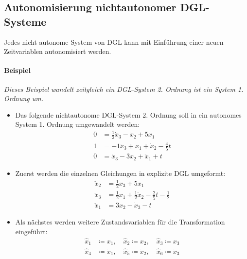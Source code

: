 \documentclass[a4paper, 11pt, accentcolor = tud3b]{tudreport}
\begin{document}
            \subsection{Autonomisierung nichtautonomer DGL-Systeme} %
                Jedes nicht-autonome System von DGL kann mit Einführung einer neuen Zeitvariablen autonomisiert werden.
                
                \paragraph{Beispiel}
	                \textit{Dieses Beispiel wandelt zeitgleich ein DGL-System 2. Ordnung ist ein System 1. Ordnung um.}
	                
	                \begin{itemize}
	                	\item Das folgende nichtautonome DGL-System 2. Ordnung soll in ein autonomes System 1. Ordnung umgewandelt werden:
		                	\begin{align*}
			                	0 &= \frac{1}{2} \dot{x} _ 3 - \ddot{x} _ 2 + 5 x _ 1 \\
			                	1 &= -1 \ddot{x} _ 3 + x _ 1 + \dot{x} _ 2 - \frac{4}{5} t \\
			                	0 &= \dot{x} _ 3 - 3 x _ 2 + \ddot{x} _ 1 + t
		                	\end{align*}
		                \item Zuerst werden die einzelnen Gleichungen in explizite DGL umgeformt:
			                \begin{align*}
				                \ddot{x} _ 2 &= \frac{1}{2} \dot{x} _ 3 + 5 x _ 1 \\
				                \ddot{x} _ 3 &= \frac{1}{2} x _ 1 + \frac{1}{2} \dot{x} _ 2 - \frac{2}{5} t - \frac{1}{2} \\
				                \ddot{x} _ 1 &= 3 x _ 2 - \dot{x} _ 3 - t
			                \end{align*}
			            \item Als nächstes werden weitere Zustandsvariablen für die Transformation eingeführt:
				            \begin{align*}
					            \hat{x} _ 1 &\coloneqq x _ 1, \quad \hat{x} _ 2 \coloneqq x _ 2, \quad \hat{x} _ 3 \coloneqq x _ 3 \\
					            \hat{x} _ 4 &\coloneqq \dot{x} _ 1, \quad \hat{x} _ 5 \coloneqq \dot{x} _ 2, \quad \hat{x} _ 6 \coloneqq \dot{x} _ 3 \\

\end{align*}
\end{itemize}
\end{document}
